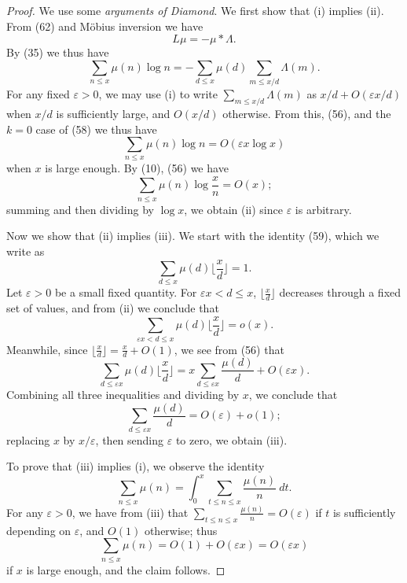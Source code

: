 \documentclass[10pt,reqno]{amsart}
\begin{document}
\begin{proof}
    We use some \emph{arguments of Diamond}. We first show that (i) implies (ii). From (62) and Möbius inversion we have
    \begin{equation}   L\mu = - \mu * \Lambda. \end{equation}
    By (35) we thus have
    \[  \sum_{n \leq x} \mu(n) \log n = - \sum_{d \leq x} \mu(d) \sum_{m \leq x/d} \Lambda(m).\]
    For any fixed $\varepsilon > 0$, we may use (i) to write $\sum_{m \leq x/d} \Lambda(m)$ as $x/d + O(\varepsilon x/d)$ when $x/d$ is sufficiently large, and $O(x/d)$ otherwise. From this, (56), and the $k=0$ case of (58) we thus have
    \[  \sum_{n \leq x} \mu(n) \log n = O( \varepsilon x \log x )\]
    when $x$ is large enough. By (10), (56) we have
    \[  \sum_{n \leq x} \mu(n) \log \frac{x}{n} = O(x);\]
    summing and then dividing by $\log x$, we obtain (ii) since $\varepsilon$ is arbitrary.

    Now we show that (ii) implies (iii). We start with the identity (59), which we write as
    \[  \sum_{d \leq x} \mu(d) \lfloor \frac{x}{d} \rfloor = 1.\]
    Let $\varepsilon>0$ be a small fixed quantity. For $\varepsilon x < d \leq x$, $\lfloor \frac{x}{d} \rfloor$ decreases through a fixed set of values, and from (ii) we conclude that
    \[  \sum_{\varepsilon x < d \leq x} \mu(d) \lfloor \frac{x}{d} \rfloor = o(x).\]
    Meanwhile, since $\lfloor \frac{x}{d} \rfloor = \frac{x}{d} + O(1)$, we see from (56) that
    \[  \sum_{d \leq \varepsilon x} \mu(d) \lfloor \frac{x}{d} \rfloor = x \sum_{d \leq \varepsilon x} \frac{\mu(d)}{d} + O(\varepsilon x).\]
    Combining all three inequalities and dividing by $x$, we conclude that
    \[  \sum_{d \leq \varepsilon x} \frac{\mu(d)}{d} = O(\varepsilon) + o(1);\]
    replacing $x$ by $x/\varepsilon$, then sending $\varepsilon$ to zero, we obtain (iii).

    To prove that (iii) implies (i), we observe the identity
    \[  \sum_{n \leq x} \mu(n) = \int_0^x \sum_{t \leq n \leq x} \frac{\mu(n)}{n}\ dt.\]
    For any $\varepsilon>0$, we have from (iii) that $\sum_{t \leq n \leq x} \frac{\mu(n)}{n} = O(\varepsilon)$ if $t$ is sufficiently depending on $\varepsilon$, and $O(1)$ otherwise; thus
    \[  \sum_{n \leq x} \mu(n) = O(1) + O( \varepsilon x ) = O(\varepsilon x)\]
    if $x$ is large enough, and the claim follows.


\end{proof}
\end{document}
